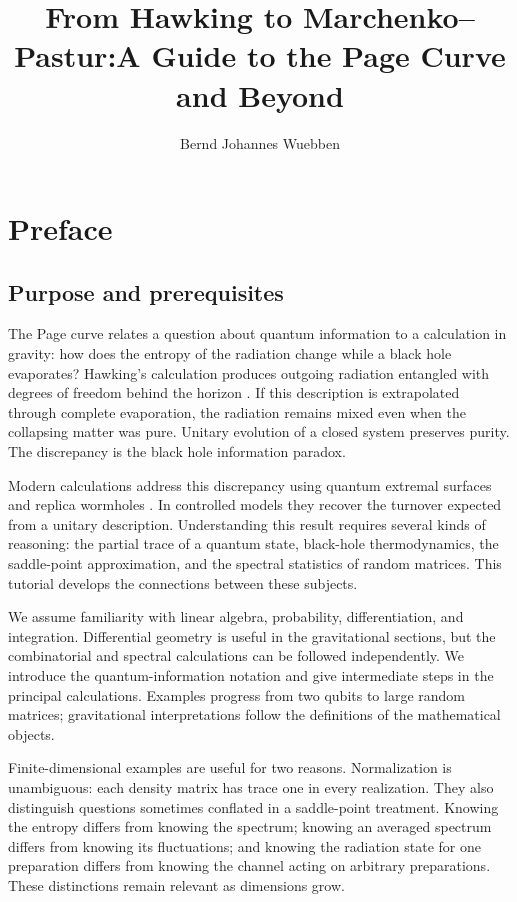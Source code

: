 \documentclass[11pt,letterpaper]{article}
\title{From Hawking to Marchenko--Pastur:\newline A Guide to the Page Curve and Beyond}
\author{Bernd Johannes Wuebben}
\affiliation{New York, NY, USA}
\theoremstyle{plain}
\theoremstyle{definition}
\theoremstyle{remark}
\begin{document}
\notoc
\maketitle
\clearpage
{}
\setcounter{page}{1}
\newpage
\tableofcontents
\newpage
{}
\setcounter{page}{1}


\section*{Preface}
\label{sec01:preface}

\subsection*{Purpose and prerequisites}

The Page curve relates a question about quantum information to a calculation
in gravity: how does the entropy of the radiation change while a black hole
evaporates? Hawking's calculation produces outgoing radiation entangled with
degrees of freedom behind the horizon \citep{hawking1975}. If this description
is extrapolated through complete evaporation, the radiation remains mixed even
when the collapsing matter was pure. Unitary evolution of a closed system
preserves purity. The discrepancy is the black hole information paradox.

Modern calculations address this discrepancy using quantum extremal surfaces
and replica wormholes \citep{engelhardtwall2015,penington2020,almheirietal2019,
almheirietal2020islands,pssyetal2022,ahmstetal2020}. In controlled models they
recover the turnover expected from a unitary description. Understanding this
result requires several kinds of reasoning: the partial trace of a quantum
state, black-hole thermodynamics, the saddle-point approximation, and the
spectral statistics of random matrices. This tutorial develops the connections
between these subjects.

We assume familiarity with linear algebra, probability, differentiation, and
integration. Differential geometry is useful in the gravitational sections,
but the combinatorial and spectral calculations can be followed independently.
We introduce the quantum-information notation and give intermediate steps in
the principal calculations. Examples progress from two qubits to large random
matrices; gravitational interpretations follow the definitions of the
mathematical objects.

Finite-dimensional examples are useful for two reasons. Normalization is
unambiguous: each density matrix has trace one in every realization. They
also distinguish questions sometimes conflated in a saddle-point treatment.
Knowing the entropy differs from knowing the spectrum; knowing an averaged
spectrum differs from knowing its fluctuations; and knowing the radiation
state for one preparation differs from knowing the channel acting on arbitrary
preparations. These distinctions remain relevant as dimensions grow.
\end{document}
